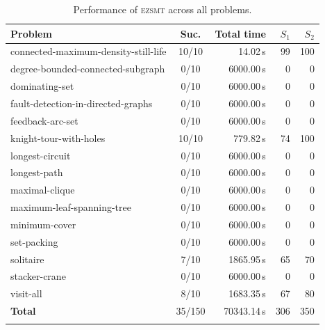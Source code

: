 \begin{table}[htbp]
\centering
\caption{Performance of \textsc{ezsmt} across all problems.}
\label{tab:performance-ezsmt}
\begin{tabular}{lcrrr}
\toprule
Problem & Suc. & Total time & $S_1$ & $S_2$ \\
\midrule
connected-maximum-density-still-life & 10/10 & 14.02\,s & 99 & 100 \\
degree-bounded-connected-subgraph & 0/10 & 6000.00\,s & 0 & 0 \\
dominating-set & 0/10 & 6000.00\,s & 0 & 0 \\
fault-detection-in-directed-graphs & 0/10 & 6000.00\,s & 0 & 0 \\
feedback-arc-set & 0/10 & 6000.00\,s & 0 & 0 \\
knight-tour-with-holes & 10/10 & 779.82\,s & 74 & 100 \\
longest-circuit & 0/10 & 6000.00\,s & 0 & 0 \\
longest-path & 0/10 & 6000.00\,s & 0 & 0 \\
maximal-clique & 0/10 & 6000.00\,s & 0 & 0 \\
maximum-leaf-spanning-tree & 0/10 & 6000.00\,s & 0 & 0 \\
minimum-cover & 0/10 & 6000.00\,s & 0 & 0 \\
set-packing & 0/10 & 6000.00\,s & 0 & 0 \\
solitaire & 7/10 & 1865.95\,s & 65 & 70 \\
stacker-crane & 0/10 & 6000.00\,s & 0 & 0 \\
visit-all & 8/10 & 1683.35\,s & 67 & 80 \\
\midrule
\textbf{Total} & 35/150 & 70343.14\,s & 306 & 350 \\
\botrule
\end{tabular}
\end{table}

